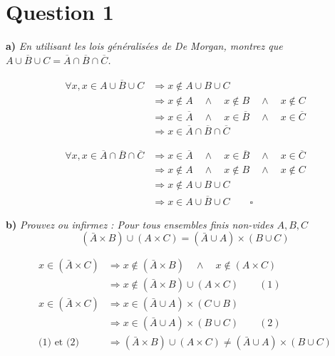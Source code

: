 \section*{Question 1}

\noindent
{\large \textbf{a)}}
\emph{En utilisant les lois généralisées de De Morgan, montrez que \(\overline{A \cup B \cup C} = \overline{A} \cap \overline{B} \cap \overline{C}\).}

\bigskip
\fbox{\(\Rightarrow\)}
\begin{align*}
	\forall x, x \in \overline{A \cup B \cup C} & \Rightarrow x \notin A \cup B \cup C                                                                       \\
	                                            & \Rightarrow x \notin A \quad \wedge \quad x \notin B \quad \wedge \quad x \notin C                         \\
	                                            & \Rightarrow x \in \overline{A} \quad \wedge \quad x \in \overline{B} \quad \wedge \quad x \in \overline{C} \\
	                                            & \Rightarrow x \in \overline{A} \cap \overline{B} \cap \overline{C}
\end{align*}

\bigskip
\fbox{\(\Leftarrow\)}
\begin{align*}
	\forall x, x \in \overline{A} \cap \overline{B} \cap \overline{C} & \Rightarrow x \in \overline{A} \quad \wedge \quad x \in \overline{B} \quad \wedge \quad x \in \overline{C} \\
	                                                                  & \Rightarrow x \notin A \quad \wedge \quad x \notin B \quad \wedge \quad x \notin C                         \\
	                                                                  & \Rightarrow x \notin A \cup B \cup C                                                                       \\
	                                                                  & \Rightarrow x \in \overline{A \cup B \cup C} \qquad \square
\end{align*}

\noindent
{\large \textbf{b)}}
\emph{Prouvez ou infirmez : Pour tous ensembles finis non-vides \(A, B, C\)}
\[(\bar{A} \times B) \cup (A \times C) = (\bar{A} \cup A) \times (B \cup C)\]

\begin{align*}
	x \in (\bar{A} \times C) & \Rightarrow x \notin (\bar{A} \times B) \quad \wedge \quad x \notin (A \times C)         \\
	                         & \Rightarrow x \notin (\bar{A} \times B) \cup (A \times C) \qquad (1)                     \\
	x \in (\bar{A} \times C) & \Rightarrow x \in (\bar{A} \cup A) \times (C \cup B)                                     \\
	                         & \Rightarrow x \in (\bar{A} \cup A) \times (B \cup C) \qquad (2)                          \\
	\text{(1) et (2)}        & \Rightarrow (\bar{A} \times B) \cup (A \times C) \neq (\bar{A} \cup A) \times (B \cup C)
\end{align*}
